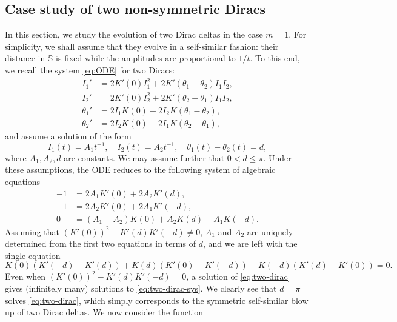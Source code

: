 \documentclass[JEP,XML,SOM,Unicode,NoFloatCountersInSection,published]{cedram}
\theoremstyle{plain}
\theoremstyle{definition}
\let\tht\theta
\newcommand{\bbS}{\mathbb S}
\begin{document}
\subsection{Case study of two non-symmetric Diracs}\label{subsec:case-study-2}

In this section, we study the evolution of two Dirac deltas in the case $m=1$. For simplicity, we shall assume that they evolve in a self-similar fashion: their distance in $\bbS$ is fixed while the amplitudes are proportional to $1/t$. To this end, we recall the system \eqref{eq:ODE} for two Diracs:\enlargethispage{.5\baselineskip}
\begin{equation*}
\begin{split}
I_1' &= 2K'(0) I_1^2 + 2K'(\tht_1-\tht_2) I_1 I_2, \\
I_2' &= 2K'(0) I_2^2 + 2K'(\tht_2-\tht_1) I_1 I_2, \\
\tht_1 ' &= 2I_1 K(0) + 2I_2 K(\tht_1-\tht_2), \\
\tht_2' &= 2I_2 K(0) + 2I_1 K(\tht_2-\tht_1),
\end{split}
\end{equation*}
and assume a solution of the form
\begin{equation*}
I_1(t)=A_1 t^{-1}, \quad I_2(t)=A_2t^{-1},\quad \tht_1(t)-\tht_2(t) = d,
\end{equation*}
where $A_1,A_2,d$ are constants. We may assume further that $0<d\le \pi$. Under these assumptions, the ODE reduces to the following system of algebraic equations
\begin{equation}\label{eq:two-dirac-sys}
\begin{split}
-1 &= 2A_1 K'(0) + 2A_{2} K'(d), \\
-1 &= 2A_{2} K'(0) + 2A_{1} K'(-d),\\
0 & = (A_{1}-A_{2})K(0) + A_{2} K(d) - A_{1}K(-d).
\end{split}
\end{equation}
Assuming that $(K'(0))^{2} - K'(d)K'(-d) \ne 0$, $A_{1}$ and $A_{2}$ are uniquely determined from the first two equations in terms of $d$, and we are left with the single equation
\begin{equation}\label{eq:two-dirac}
K(0)(K'(-d)-K'(d)) + K(d)(K'(0)-K'(-d)) + K(-d)(K'(d)-K'(0)) = 0.
\end{equation}
Even when $(K'(0))^{2} - K'(d)K'(-d) = 0$, a solution of \eqref{eq:two-dirac} gives (infinitely many) solutions to \eqref{eq:two-dirac-sys}. We clearly see that $d=\pi$ solves \eqref{eq:two-dirac}, which simply corresponds to the symmetric self-similar blow up of two Dirac deltas. We now consider the function\vspace*{-3pt}
\end{document}
